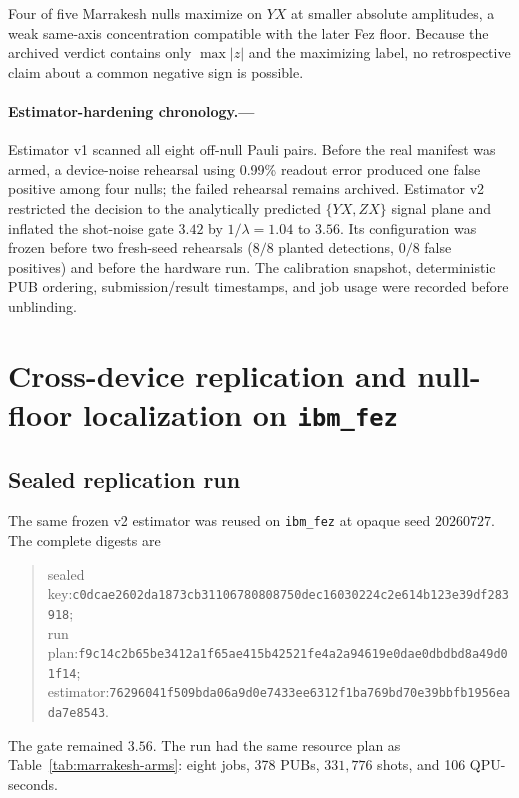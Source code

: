 \documentclass[aps,prl,reprint,superscriptaddress,nofootinbib]{revtex4-2}
\newcommand{\hashfour}[4]{\texttt{#1}\allowbreak\texttt{#2}\allowbreak\texttt{#3}\allowbreak\texttt{#4}}
\begin{document}
Four of five Marrakesh nulls maximize on $YX$ at smaller absolute amplitudes, a weak same-axis concentration compatible with the later Fez floor.  Because the archived verdict contains only $\max|z|$ and the maximizing label, no retrospective claim about a common negative sign is possible.

\paragraph{Estimator-hardening chronology.---}
Estimator v1 scanned all eight off-null Pauli pairs.  Before the real manifest was armed, a device-noise rehearsal using 0.99\% readout error produced one false positive among four nulls; the failed rehearsal remains archived.  Estimator v2 restricted the decision to the analytically predicted $\{YX,ZX\}$ signal plane and inflated the shot-noise gate $3.42$ by $1/\lambda=1.04$ to $3.56$.  Its configuration was frozen before two fresh-seed rehearsals ($8/8$ planted detections, $0/8$ false positives) and before the hardware run.  The calibration snapshot, deterministic PUB ordering, submission/result timestamps, and job usage were recorded before unblinding.

\section{Cross-device replication and null-floor localization on \texttt{ibm\_fez}}
\label{sec:fez}

\subsection{Sealed replication run}

The same frozen v2 estimator was reused on \texttt{ibm\_fez} at opaque seed $20260727$.  The complete digests are
\begin{quote}\small\raggedright
sealed key:\quad \hashfour{c0dcae2602da1873}{cb31106780808750}{dec16030224c2e61}{4b123e39df283918};\\
run plan:\quad \hashfour{f9c14c2b65be3412}{a1f65ae415b42521}{fe4a2a94619e0dae}{0dbdbd8a49d01f14};\\
estimator:\quad \hashfour{76296041f509bda0}{6a9d0e7433ee6312}{f1ba769bd70e39bb}{fb1956eada7e8543}.
\end{quote}
The gate remained $3.56$.  The run had the same resource plan as Table~\ref{tab:marrakesh-arms}: eight jobs, 378 PUBs, $331{,}776$ shots, and 106 QPU-seconds.
\end{document}
